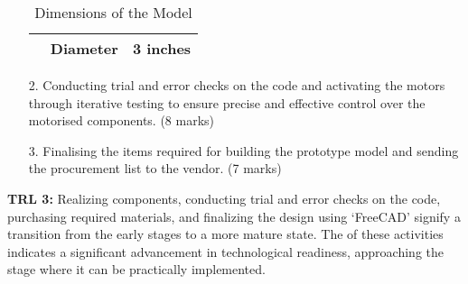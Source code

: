 \documentclass[table,french,english]{rapportCS}
\begin{document}
\begin{enumerate}
\begin{table}[h]
\begin{center}
\begin{tabular}{|>{\centering\arraybackslash}c|p{7.5cm}|r|}
  \hline 
  \multicolumn{1}{|c|}{\multirow{1}{2cm}{\textbf{Fan}}} & Diameter & 3 inches\\
  \hline
\end{tabular}
\caption{Dimensions of the Model}
\end{center}
\end{table}
\newpage
    \item[2.] Conducting trial and error checks on the code and activating the motors through iterative testing to ensure precise and effective control over the motorised components. (8 marks)
    \item[3.] Finalising the items required for building the prototype model and sending the procurement list to the vendor. (7 marks)
\end{enumerate}
\textbf{TRL 3:} Realizing components, conducting trial and error checks on the code, purchasing required materials, and finalizing the design using ‘FreeCAD’ signify a transition from the early stages to a more mature state. The  of these activities indicates a significant advancement in technological readiness, approaching the stage where it can be practically implemented.

\vspace{1cm}
\end{document}
